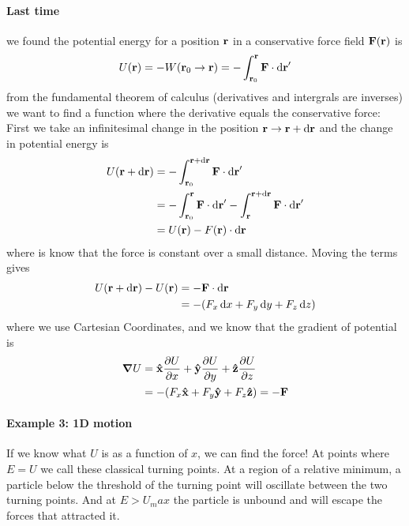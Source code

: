 \documentclass[../main.tex]{subfiles}
\begin{document}
\paragraph{Last time} we found the potential energy for a position $\vb{r}$ in a conservative force
field $\vb{F}(\vb{r})$ is
\begin{align*}
    U(\vb{r}) = -W(\vb{r}_0 \to \vb{r}) = -\int_{\vb{r}_0}^{\vb{r}} \vb{F} \cdot \dd{\vb{r}}'
\end{align*}
from the fundamental theorem of calculus (derivatives and intergrals are inverses) we want to find
a function where the derivative equals the conservative force: First we take an infinitesimal change
in the position $\vb{r} \to \vb{r} + \dd{\vb{r}}$ and the change in potential energy is
\begin{align*}
    U(\vb{r} + \dd{\vb{r}}) &= - \int_{\vb{r}_0}^{\vb{r} + \dd{\vb{r}}} \vb{F} \cdot \dd{\vb{r}}' \\
    &= - \int_{\vb{r}_0}^{\vb{r}} \vb{F} \cdot \dd{\vb{r}}' - \int_{\vb{r}}^{\vb{r} + \dd{\vb{r}}}
    \vb{F} \cdot \dd{\vb{r}}' \\
    &= U(\vb r) - F(\vb r) \cdot \dd{\vb{r}}
\end{align*}
where is know that the force is constant over a small distance. Moving the terms gives
\begin{align*}
    U(\vb{r} + \dd{\vb{r}}) - U(\vb{r}) &= - \vb{F} \cdot \dd{\vb{r}} \\
    &= - (F_x \dd{x} + F_y \dd{y} + F_z \dd{z})
\end{align*}
where we use Cartesian Coordinates, and we know that the gradient of potential is
\begin{align*}
    \grad U &= \vu{x} \pdv{U}{x} + \vu{y} \pdv{U}{y} + \vu{z} \pdv{U}{z} \\
    &= - (F_x \vu{x} + F_y \vu{y} + F_z \vu{z}) = - \vb{F}
\end{align*}

\paragraph{Example 3: 1D motion} If we know what $U$ is as a function of $x$, we can find the force!
At points where $E = U$ we call these classical turning points. At a region of a relative minimum, 
a particle below the threshold of the turning point will oscillate between the two turning points.
And at $E>U_max$ the particle is unbound and will escape the forces that attracted it.
\end{document}
